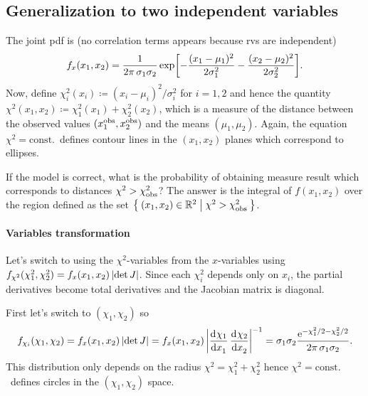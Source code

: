 \subsection{Generalization to two independent variables}

The joint \ac{pdf} is (no correlation terms appears because \acp{rv} are independent)
\begin{equation}
  f_x(x_1,x_2) = \frac{1}{2\pi\,\sigma_1\sigma_2}%
  \exp\squareBrackets*{%
	-\frac{(x_1-\mu_1)^2}{2\sigma_1^2}
	-\frac{(x_2-\mu_2)^2}{2\sigma_2^2}
  }.
\end{equation}
Now, define $\chi^2_i(x_i)\coloneqq (x_i-\mu_i)^2\!/\sigma_i^2$ for $i=1,2$ and hence the quantity $\chi^2(x_1,x_2) \coloneqq \chi^2_1(x_1) + \chi^2_2(x_2)$, which is a measure of the distance between the observed values $(x_1^\textup{obs},x_2^\textup{obs})$ and the means $(\mu_1,\mu_2)$.
Again, the equation $\chi^2 = \text{const.}$~defines contour lines in the $(x_1,x_2)$ planes which correspond to ellipses.


If the model is correct, what is the probability of obtaining measure result which corresponds to distances $\chi^2 > \chi^2_\textup{obs}$?
The answer is the integral of $f(x_1,x_2)$ over the region defined as the set $\Set{(x_1,x_2)\in\ensuremath{\mathbb{R}}^2|\chi^2 > \chi^2_\textup{obs}}$.


\paragraph{Variables transformation}
Let's switch to using the $\chi^2$-variables from the $x$-variables using $f_{\chi^2}(\chi^2_1,\chi^2_2) = f_x(x_1,x_2)\,\lvert\det J\rvert$.
Since each $\chi^2_i$ depends only on $x_i$, the partial derivatives become total derivatives and the Jacobian matrix is diagonal.


First let's switch to $(\chi_1,\chi_2)$ so
\begin{equation}\label{eq:chiIplane}
	f_{\chi_i}(\chi_1,\chi_2) = f_x(x_1,x_2)\,\abs{\det J} = f_x(x_1,x_2)\,\abs*{\deriv{\chi_1}{x_1}\,\deriv{\chi_2}{x_2}}^{-1} = \sigma_1\sigma_2 \frac{\eu^{-\chi^2_1/2 - \chi^2_2/2 }}{2\pi\,\sigma_1\sigma_2}.
\end{equation}
This distribution only depends on the radius $\chi^2  = \chi_1^2 + \chi_2^2$ hence $\chi^2 = \text{const.}$~defines circles in the $(\chi_1,\chi_2)$ space.


